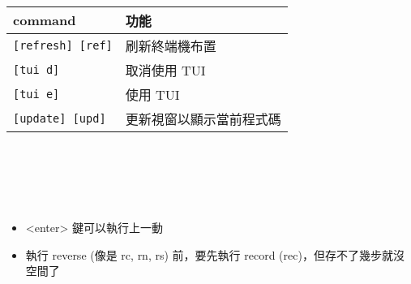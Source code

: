 \begin{center}
     \\
    \begin{tabular}{|p{2.7cm}|p{2.7cm}|}
        \hline
        command                         & 功能 \\
        \hline
        \verb|[refresh] [ref]|          & 刷新終端機布置 \\
        \verb|[tui d]|                  & 取消使用 TUI \\
        \verb|[tui e]|                  & 使用 TUI \\
        \verb|[update] [upd]|           & 更新視窗以顯示當前程式碼 \\
        \hline
    \end{tabular} \\
    \hspace{\fill} \\
    \hspace{\fill} \\

     \\
    \begin{itemize}
        \item <enter> 鍵可以執行上一動
        \item 執行 reverse (像是 rc, rn, rs) 前，要先執行 record (rec)，但存不了幾步就沒空間了
    \end{itemize}
\end{center}